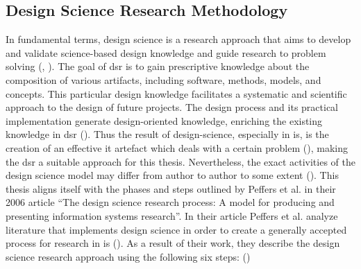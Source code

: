 

\subsection{Design Science Research Methodology}

In fundamental terms, design science is a research approach that aims to develop and validate science-based design knowledge and guide research to problem solving (\cite{Hevner.2004}, \cite{Dresch.2015}). The goal of \ac{dsr} is to gain prescriptive knowledge about the composition of various artifacts, including software, methods, models, and concepts. This particular design knowledge facilitates a systematic and scientific approach to the design of future projects. The design process and its practical implementation generate design-oriented knowledge, enriching the existing knowledge in \ac{dsr} (\cite{Hevner.2004}). Thus the result of design-science, especially in \ac{is}, is the creation of an effective \ac{it} artefact which deals with a certain problem (\cite{Hevner.2004}), making the \ac{dsr} a suitable approach for this thesis. Nevertheless, the exact activities of the design science model may differ from author to author to some extent (\cite{Fulcher.1996}). This thesis aligns itself with the phases and steps outlined by Peffers et al. in their 2006 article \enquote{The design science research process: A model for producing and presenting information systems research}. In their article Peffers et al. analyze literature that implements design science in order to create a generally accepted process for research in \ac{is} (\cite{Peffers.2006}). As a result of their work, they describe the design science research approach using the following six steps: (\cite{Peffers.2006}) 

